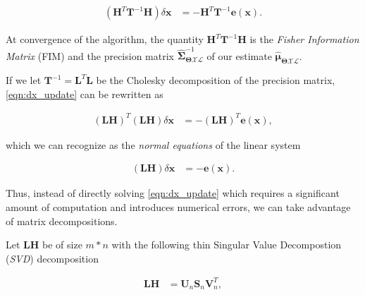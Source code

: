 \begin{equation}\label{eqn:dx_update}
  \begin{aligned}
  (\mathbf{H}^T\mathbf{T}^{-1}\mathbf{H})\delta\mathbf{x} &=
    -\mathbf{H}^T\mathbf{T}^{-1}\mathbf{e}(\mathbf{x}).
  \end{aligned}
\end{equation}

At convergence of the algorithm, the quantity
$\mathbf{H}^T\mathbf{T}^{-1}\mathbf{H}$ is the \emph{Fisher Information Matrix}
(FIM) and the precision matrix
$\hat{\boldsymbol{\Sigma}}_{\boldsymbol{\Theta}\mathcal{X}\mathcal{L}}^{-1}$ of
our estimate
$\hat{\boldsymbol{\mu}}_{\boldsymbol{\Theta}\mathcal{X}\mathcal{L}}$.

If we let $\mathbf{T}^{-1}=\mathbf{L}^T\mathbf{L}$ be the Cholesky
decomposition of the precision matrix, \eqref{eqn:dx_update} can be rewritten as

\begin{equation}\label{eqn:dx_update_normal}
  \begin{aligned}
  (\mathbf{L}\mathbf{H})^T(\mathbf{L}\mathbf{H})\delta\mathbf{x} &= 
    -(\mathbf{L}\mathbf{H})^T\mathbf{e}(\mathbf{x}),
  \end{aligned}
\end{equation}

which we can recognize as the \emph{normal equations} of the linear system

\begin{equation}\label{eqn:dx_update_standard}
  \begin{aligned}
  (\mathbf{L}\mathbf{H})\delta\mathbf{x} &= -\mathbf{e}(\mathbf{x}).
  \end{aligned}
\end{equation}

Thus, instead of directly solving \eqref{eqn:dx_update} which requires a
significant amount of computation and introduces numerical errors, we can take
advantage of matrix decompositions.

Let $\mathbf{L}\mathbf{H}$ be of size $m*n$ with the following thin
Singular Value Decompostion (\emph{SVD}) decomposition

\begin{equation}\label{eqn:svd_decomposition}
  \begin{aligned}
  \mathbf{L}\mathbf{H} &= \mathbf{U}_n\mathbf{S}_n\mathbf{V}_n^T,
  \end{aligned}
\end{equation}

